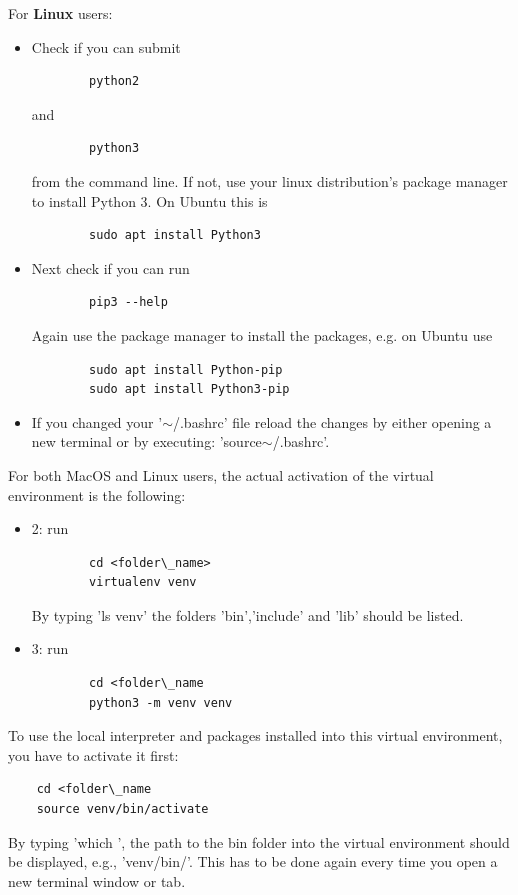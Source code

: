 \documentclass[a4paper, 11pt, fleqn]{memoir}
\begin{document}
For \textbf{Linux} users:
\begin{itemize}
    \item Check if you can submit
          \begin{verbatim}
        python2
    \end{verbatim}
          and
          \begin{verbatim}
        python3
    \end{verbatim}
          from the command line.
          If not, use your linux distribution's package manager to install Python 3.
          On Ubuntu this is
          \begin{verbatim}
        sudo apt install Python3
    \end{verbatim}
    \item Next check if you can run
          \begin{verbatim}
        pip3 --help
    \end{verbatim}
          Again use the package manager to install the packages, e.g. on Ubuntu use
          \begin{verbatim}
        sudo apt install Python-pip
        sudo apt install Python3-pip
    \end{verbatim}
    \item If you changed your '$\sim$/.bashrc' file reload the changes by either opening a new terminal or by executing: 'source$\sim$/.bashrc'.
\end{itemize}

For both MacOS and Linux users, the actual activation of the virtual environment is the following:
\begin{itemize}
    \item {} 2: run
          \begin{verbatim} 
        cd <folder\_name>
        virtualenv venv
    \end{verbatim}
          By typing 'ls venv' the folders 'bin','include' and 'lib' should be listed.
    \item {} 3: run
          \begin{verbatim}
        cd <folder\_name
        python3 -m venv venv
    \end{verbatim}
\end{itemize}

To use the local interpreter and packages installed into this virtual environment, you have to activate it first:
\begin{verbatim}
    cd <folder\_name
    source venv/bin/activate
\end{verbatim}
By typing 'which ', the path to the bin folder into the virtual environment should be displayed, e.g., 'venv/bin/'.
This has to be done again every time you open a new terminal window or tab.
\end{document}
